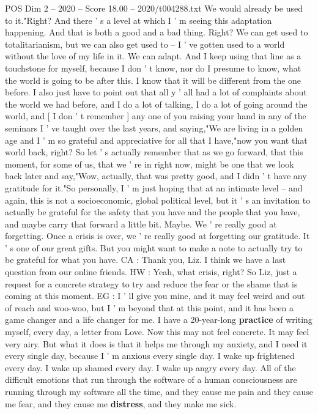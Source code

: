 \begin{textsample}{POS Dim 2 – 2020 – Score 18.00 – 2020/t004288.txt}
We would already be used to it."Right?
And there ' s a level at which I ' m seeing this adaptation happening.
And that is both a good and a bad thing.
Right?
We can get used to totalitarianism, but we can also get used to -- I ' ve gotten used to a world without the love of my life in it.
We can adapt.
And I keep using that line as a touchstone for myself, because I don ' t know, nor do I presume to know, what the world is going to be after this.
I know that it will be different from the one before.
I also just have to point out that all y ' all had a lot of complaints about the world we had before, and I do a lot of talking, I do a lot of going around the world, and [ I don ' t remember ] any one of you raising your hand in any of the seminars I ' ve taught over the last years, and saying,"We are living in a golden age and I ' m so grateful and appreciative for all that I have,"now you want that world back, right?
So let ' s actually remember that as we go forward, that this moment, for some of us, that we ' re in right now, might be one that we look back later and say,"Wow, actually, that was pretty good, and I didn ' t have any gratitude for it."So personally, I ' m just hoping that at an intimate level -- and again, this is not a socioeconomic, global political level, but it ' s an invitation to actually be grateful for the safety that you have and the people that you have, and maybe carry that forward a little bit.
Maybe.
We ' re really good at forgetting.
Once a crisis is over, we ' re really good at forgetting our gratitude.
It ' s one of our great gifts.
But you might want to make a note to actually try to be grateful for what you have.
CA : Thank you, Liz.
I think we have a last question from our online friends.
HW : Yeah, what crisis, right?
So Liz, just a request for a concrete strategy to try and reduce the fear or the shame that is coming at this moment.
EG : I ' ll give you mine, and it may feel weird and out of reach and woo-woo, but I ' m beyond that at this point, and it has been a game changer and a life changer for me.
I have a 20-year-long \textbf{practice} of writing myself, every day, a letter from Love.
Now this may not feel concrete.
It may feel very airy.
But what it does is that it helps me through my anxiety, and I need it every single day, because I ' m anxious every single day.
I wake up frightened every day.
I wake up shamed every day.
I wake up angry every day.
All of the difficult emotions that run through the software of a human consciousness are running through my software all the time, and they cause me pain and they cause me fear, and they cause me \textbf{distress}, and they make me sick.

\end{textsample}
